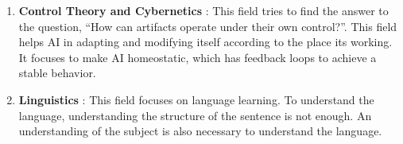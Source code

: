 \documentclass{article}
\begin{document}
\begin{enumerate}
		\item \textbf{Control Theory and Cybernetics} : This field tries to find the answer to the question, “How can artifacts operate under their own control?”. This field helps AI in adapting and modifying itself according to the place its working. It focuses to make AI homeostatic, which has feedback loops to achieve a stable behavior.

		\item \textbf{Linguistics} : This field focuses on language learning. To understand the language, understanding the structure of the sentence is not enough. An understanding of the subject is also necessary to understand the language. 
	\end{enumerate}


	
	
\end{document}
